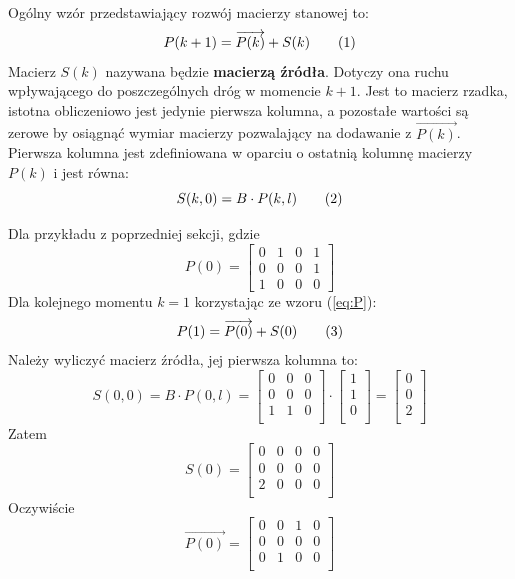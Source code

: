 \documentclass[12pt]{book}
\newcommand\addtag{\refstepcounter{equation}
\renewcommand{\labelenumii}{\theenumii}
\renewcommand{\theenumii}{\theenumi.\arabic{enumii}.}
\tag{\theequation}}
\begin{document}
\begin{tcolorbox}

Ogólny wzór przedstawiający rozwój macierzy stanowej to:
\[P(k+1)=\overrightarrow{P(k)} + S(k) \addtag \label{eq:P}\]
Macierz $S(k)$ nazywana będzie \textbf{macierzą źródła}. Dotyczy ona ruchu wpływającego do poszczególnych dróg w momencie $k+1$. Jest to macierz rzadka, istotna obliczeniowo jest jedynie pierwsza kolumna, a pozostałe wartości są zerowe by osiągnąć wymiar macierzy pozwalający na dodawanie z $\overrightarrow{P(k)}$. Pierwsza kolumna jest zdefiniowana w oparciu o ostatnią kolumnę macierzy $P(k)$ i jest równa:
\[S(k,0)=B\cdot P(k,l) \addtag \label{eq:S} \]
\end{tcolorbox} \noindent
Dla przykładu z poprzedniej sekcji, gdzie
\[P(0)= \begin{bmatrix} 0 & 1 & 0 & 1\\
       0 & 0 & 0 & 1 \\
       1 & 0 & 0 & 0 \end{bmatrix}\]
Dla kolejnego momentu $k=1$ korzystając ze wzoru (\ref{eq:P}):
\[P(1)=\overrightarrow{P(0)}+S(0) \addtag \label{eq:P_1} \]
Należy wyliczyć macierz źródła, jej pierwsza kolumna to:
\[S(0,0)=B\cdot P(0,l)=
  \begin{bmatrix}
   0 & 0 & 0\\
   0 & 0 & 0\\
   1 & 1 & 0\\
   \end{bmatrix}
   \cdot
   \begin{bmatrix}
   1\\
   1\\
   0\\
   \end{bmatrix}
   =
      \begin{bmatrix}
   0\\
   0\\
   2\\
   \end{bmatrix}
 \]
 Zatem 
 \[S(0)=\begin{bmatrix}
 0 & 0 & 0 & 0\\
 0 & 0 & 0 & 0\\
 2 & 0 & 0 & 0\\
 \end{bmatrix}\]
 Oczywiście
 \[ \overrightarrow{P(0)}=
\begin{bmatrix}
 0 & 0 & 1 & 0\\
 0 & 0 & 0 & 0\\
 0 & 1 & 0 & 0\\
 \end{bmatrix} 
 \]
  
\end{document}
